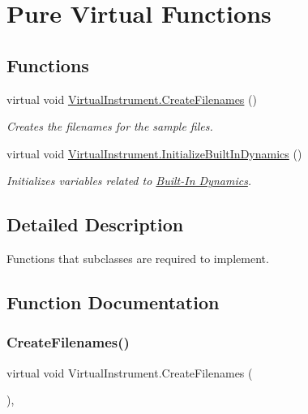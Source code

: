 \hypertarget{group___v_i_base_virt_func}{}\section{Pure Virtual Functions}
\label{group___v_i_base_virt_func}
\subsection*{Functions}
\begin{DoxyCompactItemize}
\item 
virtual void \hyperlink{group___v_i_base_virt_func_gaacfc9521214176292bfb9665556fb991}{Virtual\+Instrument.\+Create\+Filenames} ()
\begin{DoxyCompactList}\small\item\em Creates the filenames for the sample files. \end{DoxyCompactList}\item 
virtual void \hyperlink{group___v_i_base_virt_func_ga995456c03ee54543b285188c51c29a07}{Virtual\+Instrument.\+Initialize\+Built\+In\+Dynamics} ()
\begin{DoxyCompactList}\small\item\em Initializes variables related to \hyperlink{group___audio_DefBID}{Built-\/\+In Dynamics}. \end{DoxyCompactList}\end{DoxyCompactItemize}


\subsection{Detailed Description}
Functions that subclasses are required to implement. 

\subsection{Function Documentation}
\mbox{\label{group___v_i_base_virt_func_gaacfc9521214176292bfb9665556fb991}} 
\subsubsection{\texorpdfstring{Create\+Filenames()}{CreateFilenames()}}
{\footnotesize\ttfamily virtual void Virtual\+Instrument.\+Create\+Filenames (\begin{DoxyParamCaption}{ }\end{DoxyParamCaption})\hspace{0.3cm}{\ttfamily [protected]}, {\ttfamily [virtual]}}




